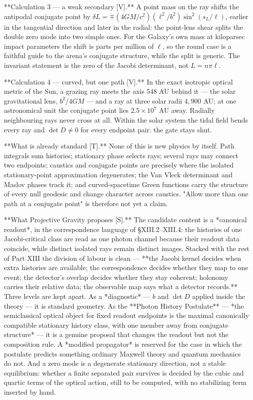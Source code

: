 **Calculation 3 — a weak secondary [V].** A point mass on the ray shifts the antipodal conjugate point by $\delta L = \mp(4GM/c^2)(\ell^2/b^2)\sin^2(s_L/\ell)$, earlier in the tangential direction and later in the radial: the point-lens shear splits the double zero mode into two simple ones. For the Galaxy's own mass at kiloparsec impact parameters the shift is parts per million of $\ell$, so the round case is a faithful guide to the arena's conjugate structure, while the split is generic. The invariant statement is the zero of the Jacobi determinant, not $L = n\pi\ell$.

**Calculation 4 — curved, but one path [V].** In the exact isotropic optical metric of the Sun, a grazing ray meets the axis $548$ AU behind it — the solar gravitational lens, $b^2/4GM$ — and a ray at three solar radii $4{,}900$ AU; at one astronomical unit the conjugate point lies $2.5\times10^7$ AU away. Radially neighbouring rays never cross at all. Within the solar system the tidal field bends every ray and $\det D\neq0$ for every endpoint pair: the gate stays shut.

**What is already standard [T].** None of this is new physics by itself. Path integrals sum histories; stationary phase selects rays; several rays may connect two endpoints; caustics and conjugate points are precisely where the isolated stationary-point approximation degenerates; the Van Vleck determinant and Maslov phases track it; and curved-spacetime Green functions carry the structure of every null geodesic and change character across caustics. "Allow more than one path at a conjugate point" is therefore not yet a claim.

**What Projective Gravity proposes [S].** The candidate content is a *canonical readout*, in the correspondence language of §XIII.2–XIII.4: the histories of one Jacobi-critical class are read as one photon channel because their readout data coincide, while distinct isolated rays remain distinct images. Stacked with the rest of Part XIII the division of labour is clean — **the Jacobi kernel decides when extra histories are available; the correspondence decides whether they map to one event; the detector's overlap decides whether they stay coherent; holonomy carries their relative data; the observable map says what a detector records.** Three levels are kept apart. As a *diagnostic* — $b$ and $\det D$ applied inside the theory — it is standard geometry. As the **Photon History Postulate** — *the semiclassical optical object for fixed readout endpoints is the maximal canonically compatible stationary history class, with one member away from conjugate structure* — it is a genuine proposal that changes the readout but not the composition rule. A *modified propagator* is reserved for the case in which the postulate predicts something ordinary Maxwell theory and quantum mechanics do not. And a zero mode is a degenerate stationary direction, not a stable equilibrium: whether a finite separated pair survives is decided by the cubic and quartic terms of the optical action, still to be computed, with no stabilizing term inserted by hand.

